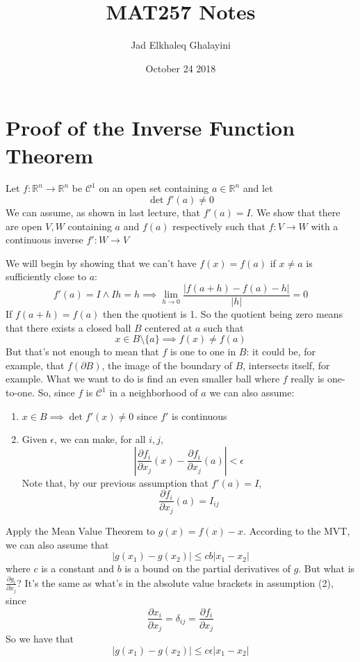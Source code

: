 \documentclass{article}
\title{MAT257 Notes}
\author{Jad Elkhaleq Ghalayini}
\date{October 24 2018}
\newcommand{\reals}[0]{\mathbb{R}}
\newcommand{\mc}[1]{\mathcal{#1}}
\newcommand{\prt}[2]{\frac{\partial #1}{\partial #2}}
\begin{document}
\maketitle

\section*{Proof of the Inverse Function Theorem}

Let \(f: \reals^n \to \reals^n\) be \(\mc{C}^1\) on an open set containing \(a \in \reals^n\) and let \[\det f'(a) \neq 0\]
We can assume, as shown in last lecture, that \(f'(a) = I\).
We show that there are open \(V, W\) containing \(a\) and \(f(a)\) respectively such that \(f: V \to W\) with a continuous inverse \(f': W \to V\)

We will begin by showing that we can't have \(f(x) = f(a)\) if \(x \neq a\) is sufficiently close to \(a\):
\[f'(a) = I \land Ih = h \implies \lim_{h \to 0}\frac{|f(a + h) - f(a) - h|}{|h|} = 0\]
If \(f(a + h) = f(a)\) then the quotient is 1. So the quotient being zero means that there exists a closed ball \(B\) centered at \(a\) such that
\[x \in B \setminus \{a\} \implies f(x) \neq f(a)\]
But that's not enough to mean that \(f\) is one to one in \(B\): it could be, for example, that \(f(\partial B)\), the image of the boundary of \(B\), intersects itself, for example. What we want to do is find an even smaller ball where \(f\) really is one-to-one. So, since \(f\) is \(\mc{C}^1\) in a neighborhood of \(a\) we can also assume:
\begin{enumerate}

  \item \(x \in B \implies \det f'(x) \neq 0\) since \(f'\) is continuous

  \item Given \(\epsilon\), we can make, for all \(i, j\), \[
    \left|\prt{f_i}{x_j}(x) - \prt{f_i}{x_j}(a)\right| < \epsilon
  \]
  Note that, by our previous assumption that \(f'(a) = I\),
  \[\prt{f_i}{x_j}(a) = I_{ij}\]

\end{enumerate}
Apply the Mean Value Theorem to \(g(x) = f(x) - x\). According to the MVT, we can also assume that
\[|g(x_1) - g(x_2)| \leq cb|x_1 - x_2|\]
where \(c\) is a constant and \(b\) is a bound on the partial derivatives of \(g\). But what is \(\prt{g_i}{x_j}\)? It's the same as what's in the absolute value brackets in assumption (2), since
\[\prt{x_i}{x_j} = \delta_{ij} = \prt{f_i}{x_j}\]
So we have that
\[|g(x_1) - g(x_2)| \leq c\epsilon|x_1 - x_2|\]
\end{document}
